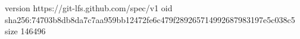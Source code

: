 version https://git-lfs.github.com/spec/v1
oid sha256:74703b8db8da7c7aa959bb12472fe6c479f289265714992687983197e5c038c5
size 146496
